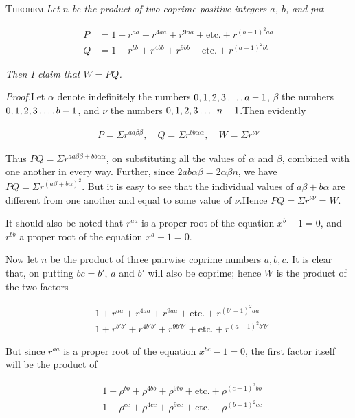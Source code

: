 
\textsc{Theorem.}\quad \textit{Let $n$ be the product of two coprime positive integers $a$, $b$,} \textit{and put}

\[
\begin{aligned}
P&=1+ r^{aa}+r^{4aa}+r^{9aa}+\text{etc.}+r^{(b-1)^2aa}\\
Q&=1+r^{bb}+r^{4bb}+r^{9bb}+\text{etc.}+r^{(a-1)^2bb}
\end{aligned}
\]

\textit{Then I claim that $W=PQ$.}

\textit{Proof.}\quad Let $\alpha$ denote indefinitely the numbers $0,1,2,3\mathinner{.\,.\,.\,.} a-1$, $\beta$ the numbers $0,1,2,3\mathinner{.\,.\,.\,.} b-1$, and $\nu$ the numbers $0,1,2,3\mathinner{.\,.\,.\,.} n-1$.\quad Then evidently

\[
\begin{aligned}
P=\Sigma r^{aa\beta\beta},\quad Q=\Sigma r^{bb\alpha\alpha},\quad W=\Sigma r^{\nu\nu}
\end{aligned}
\]

Thus $PQ=\Sigma r^{aa\beta\beta+bb\alpha\alpha}$, on substituting all the values of $\alpha$ and $\beta$, combined with one another in every way. Further, since $2ab\alpha\beta=2\alpha\beta n$, we have $PQ=\Sigma r^{(a\beta+b\alpha)^2}$. But it is easy to see that the individual values of $a\beta+b\alpha$ are different from one another and equal to some value of $\nu$.\quad Hence $PQ=\Sigma r^{\nu\nu}=W$.

It should also be noted that $r^{aa}$ is a proper root of the equation $x^b-1=0$, and $r^{bb}$ a proper root of the equation $x^a-1=0$.



Now let $n$ be the product of three pairwise coprime numbers $a,b,c$. It is clear that, on putting $bc=b'$, $a$ and $b'$ will also be coprime; hence $W$ is the product of the two factors

\[
\begin{aligned}
&1+r^{aa}+r^{4aa}+r^{9aa}+\text{etc.}+r^{(b'-1)^2aa}\\
&1+r^{b'b'}+r^{4b'b'}+r^{9b'b'}+\text{etc.}+r^{(a-1)^2b'b'}
\end{aligned}
\]

But since $r^{aa}$ is a proper root of the equation $x^{bc}-1=0$, the first factor itself will be the product of

\[
\begin{aligned}
&1+\rho^{bb}+\rho^{4bb}+\rho^{9bb}+\text{etc.}+\rho^{(c-1)^2bb}\\
&1+\rho^{cc}+\rho^{4cc}+\rho^{9cc}+\text{etc.}+\rho^{(b-1)^2cc}
\end{aligned}
\]

